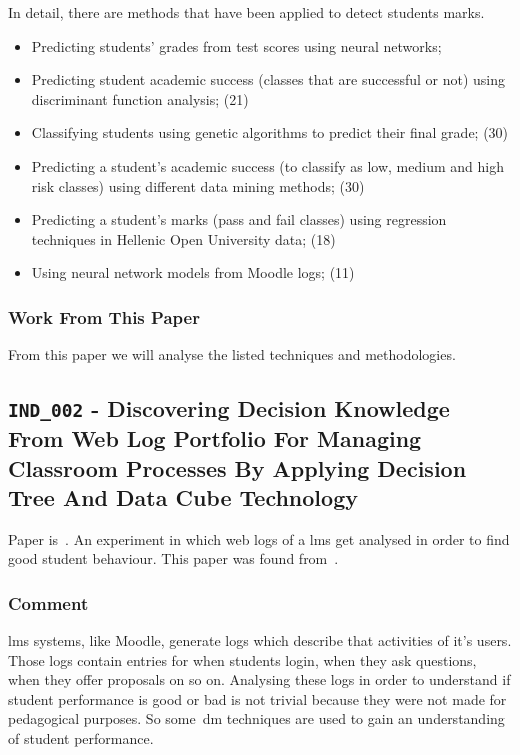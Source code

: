 In detail, there are methods that have been applied to detect students marks.

\begin{itemize}
    \item Predicting students' grades from test scores using neural
        networks;~\cite{ind_003}
    \item Predicting student academic success (classes that are successful or
        not) using discriminant function analysis; (21)
    \item Classifying students using genetic algorithms to predict their final
        grade; (30)
    \item Predicting a student's academic success (to classify as low, medium
        and high risk classes) using different data mining methods; (30)
    \item Predicting a student’s marks (pass and fail classes) using regression
        techniques in Hellenic Open University data; (18)
    \item Using neural network models from Moodle logs; (11)
\end{itemize}

\subsubsection{Work From This Paper}

From this paper we will analyse the listed techniques and methodologies.

\subsection{\texttt{IND\_002} - Discovering Decision Knowledge From Web Log
Portfolio For Managing Classroom Processes By Applying Decision Tree And Data
Cube Technology}

Paper is~\cite{ind_002}. An experiment in which web logs of a \gls{lms} get
analysed in order to find good student behaviour. This paper was found
from~\cite{ind_001}.

\subsubsection{Comment}

\gls{lms} systems, like Moodle, generate logs which describe that activities of
it's users. Those logs contain entries for when students login, when they ask
questions, when they offer proposals on so on. Analysing these logs in order to
understand if student performance is good or bad is not trivial because they
were not made for pedagogical purposes. So some~\gls{dm} techniques are used to
gain an understanding of student performance.

